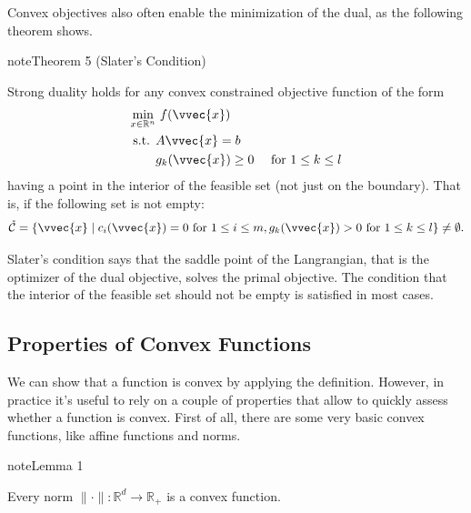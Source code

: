\documentclass[letterpaper,10pt,english]{jupyterBook}
\begin{document}
\sphinxAtStartPar
Convex objectives also often enable the minimization of the dual, as the following theorem shows.
\label{optimization_convex:theorem-5}
\begin{sphinxadmonition}{note}{Theorem 5 (Slater’s Condition)}



\sphinxAtStartPar
Strong duality holds for any convex constrained objective function of the form
\begin{align*}
    \min_{x\in\mathbb{R}^n}&\ f(\vvec{x}) \\
    \text{s.t. } & A\vvec{x} =b  &\\
     &g_k(\vvec{x})\geq 0 &\text{ for }1\leq k\leq l
\end{align*}
\sphinxAtStartPar
having a point in the interior of the feasible set (not just on the boundary). That is, if the following set is not empty:
\begin{equation*}
\begin{split}\mathring{\mathcal{C}} = \{\vvec{x}\mid c_i(\vvec{x}) =0  \text{ for } 1\leq i \leq m,g_k(\vvec{x})> 0 \text{ for }1\leq k\leq l\}\neq \emptyset.\end{split}
\end{equation*}
\end{sphinxadmonition}

\sphinxAtStartPar
Slater’s condition says that the saddle point of the Langrangian, that is the optimizer of the dual objective, solves the primal objective. The condition that the interior of the feasible set should not be empty is satisfied in most cases.


\subsection{Properties of Convex Functions}
\label{\detokenize{optimization_convex:properties-of-convex-functions}}
\sphinxAtStartPar
We can show that a function is convex by applying the definition. However, in practice it’s useful to rely on a couple of properties that allow to quickly assess whether a function is convex. First of all, there are some very basic convex functions, like affine functions and norms.
\label{optimization_convex:lemma-6}
\begin{sphinxadmonition}{note}{Lemma 1}



\sphinxAtStartPar
Every norm \(\lVert\cdot\rVert:\mathbb{R}^d\rightarrow \mathbb{R}_+\) is a convex function.
\end{sphinxadmonition}
\end{document}
